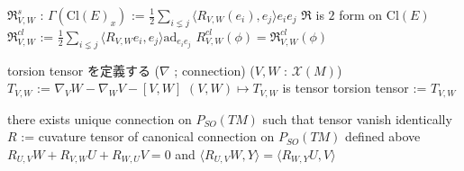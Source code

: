 \begin{Definition}
\itemdefi
  \Define \(\mathfrak{R}_{V,W}^s\) : \(\Gamma(\text{Cl}(E)_x)\) :=
  \(\frac{1}{2}\sum_{i \lneq j} \langle R_{V,W}(e_i) , e_j \rangle e_i e_j\)
\itemprop
  \(\mathfrak{R}\) is \(2\) form on \(\text{Cl}(E)\)
\itemdefi
  \Define \(\mathfrak{R}_{V,W}^{cl}\) :=
  \(\frac{1}{2} \sum_{i \lneq j} \langle R_{V,W} e_i , e_j \rangle \text{ad}_{e_i e_j}\)
\itemprop
  \(R_{V,W}^{cl}(\phi) = \mathfrak{R}_{V,W}^{cl}(\phi)\)
\end{Definition}

\begin{Definition}
\itemnote
  torsion tensor を定義する
\itemdefi
  \For (\(\nabla\) ; connection) (\(V , W\) : \(\mathcal{X}(M)\)) \\
  \(T_{V,W}\) := \(\nabla_V W- \nabla_W V - [V,W]\)
\itemprop
  \((V , W) \mapsto T_{V,W}\) is tensor
\itemdefi
  \Define torsion tensor := \(T_{V,W}\)
\end{Definition}

\begin{Theorem}
\itemprop
  there exists unique connection on \(P_{SO}(TM)\) such that tensor vanish identically
\itemprop
  \Let \(R\) := cuvature tensor of canonical connection on \(P_{SO}(TM)\) defined above \\
  \Then \(R_{U,V}W + R_{V,W}U + R_{W,U}V = 0\) and \(\langle R_{U,V} W , Y \rangle = \langle R_{W,Y} U , V \rangle\)
\end{Theorem}